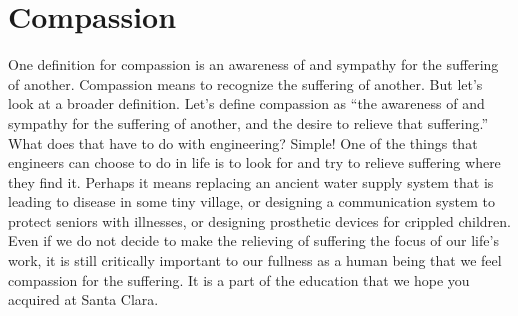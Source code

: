 \section{Compassion}
One definition for compassion is an awareness of and sympathy for the suffering of another. Compassion means to recognize the suffering of another. But let’s look at a broader definition. Let’s define compassion as “the awareness of and sympathy for the suffering of another, and the desire to relieve that suffering.” What does that have to do with engineering? Simple! One of the things that engineers can choose to do in life is to look for and try to relieve suffering where they find it. Perhaps it means replacing an ancient water supply system that is leading to disease in some tiny village, or designing a communication system to protect seniors with illnesses, or designing prosthetic devices for crippled children. Even if we do not decide to make the relieving of suffering the focus of our life’s work, it is still critically important to our fullness as a human being that we feel compassion for the suffering. It is a part of the education that we hope you acquired at Santa Clara.
